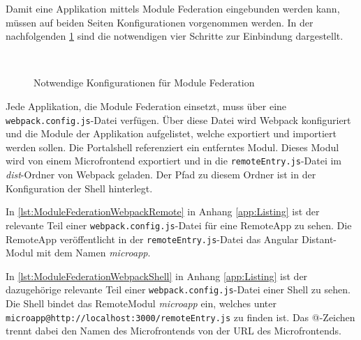 Damit eine Applikation mittels Module Federation eingebunden werden kann, müssen auf beiden Seiten Konfigurationen vorgenommen werden. In der nachfolgenden \cref{fig:ModuleFederation} sind die notwendigen vier Schritte zur Einbindung dargestellt.

\begin{figure}[hbt!]
	\centering
	\begin{minipage}[t]{0.64\textwidth}	
		\caption{Notwendige Konfigurationen für Module Federation}
		\\ %
		\label{fig:ModuleFederation}
	\end{minipage}
\end{figure}

Jede Applikation, die Module Federation einsetzt, muss über eine \texttt{webpack.config.js}-Datei verfügen. Über diese Datei wird Webpack konfiguriert und die Module der Applikation aufgelistet, welche exportiert und importiert werden sollen. Die Portalshell referenziert ein entferntes Modul. Dieses Modul wird von einem Microfrontend exportiert und in die \texttt{remoteEntry.js}-Datei im \textit{dist}-Ordner von Webpack geladen. Der Pfad zu diesem Ordner ist in der Konfiguration der Shell hinterlegt.

In \cref{lst:ModuleFederationWebpackRemote} in Anhang \ref{app:Listing} ist der relevante Teil einer \texttt{webpack.config.js}-Datei für eine RemoteApp zu sehen. Die RemoteApp veröffentlicht in der \texttt{remoteEntry.js}-Datei das Angular Distant-Modul mit dem Namen \textit{microapp}.

In \cref{lst:ModuleFederationWebpackShell} in Anhang \ref{app:Listing} ist der dazugehörige relevante Teil einer \texttt{webpack.config.js}-Datei einer Shell zu sehen. 
Die Shell bindet das RemoteModul \textit{microapp} ein, welches unter \texttt{microapp@http://localhost:3000/remoteEntry.js} zu finden ist. Das @-Zeichen trennt dabei den Namen des Microfrontends von der \gls{URL} des Microfrontends.

